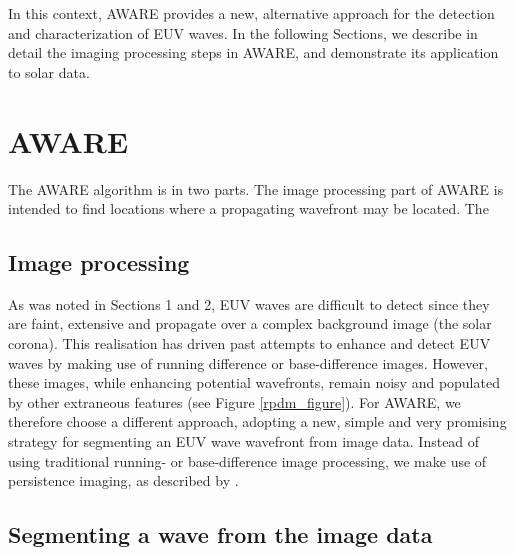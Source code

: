 \documentclass[namedreferences]{solarphysics}
\begin{document}
\begin{article}
In this context, AWARE provides a new, alternative approach for the
detection and characterization of EUV waves.  In the following
Sections, we describe in detail the imaging processing steps in AWARE,
and demonstrate its application to solar data.

\section{AWARE}\label{sec:aware}

The AWARE algorithm is in two parts.  The image processing part of
AWARE is intended to find locations where a propagating wavefront may
be located.  The 


\subsection{Image processing}
\label{img_proc}

As was noted in Sections 1 and 2, EUV waves are difficult to detect
since they are faint, extensive and propagate over a complex
background image (the solar corona). This realisation has driven past
attempts to enhance and detect EUV waves by making use of running
difference or base-difference images. However, these images, while
enhancing potential wavefronts, remain noisy and populated by other
extraneous features (see Figure \ref{rpdm_figure}). For AWARE, we
therefore choose a different approach, adopting a new, simple and very
promising strategy for segmenting an EUV wave wavefront from image
data. Instead of using traditional running- or base-difference image
processing, we make use of persistence imaging, as described by
\citet{2014AAS...22421838T}.

\subsection{Segmenting a wave from the image data}\label{sec:aware:segment}


\end{article}
\end{document}
